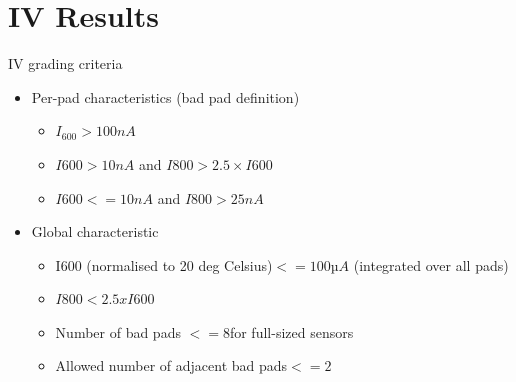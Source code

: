 \documentclass{beamer}
\begin{document}
  

\section{IV Results}

\begin{frame}{IV grading criteria}
   \begin{itemize}
       \item \alert{Per-pad} characteristics (\alert{bad pad} definition)
            \begin{itemize}
                \item $ {I}_{600} > 100 nA $
                \item $ I600 > 10 nA  $  and $ I800 > 2.5 \times I600 $
                \item $ I600 <= 10 nA $  and $ I800 > 25 nA $
            \end{itemize}
       \item \alert{Global} characteristic
            \begin{itemize}
                \item I600 (normalised to 20 deg Celsius)$ <= 100 µA $ (integrated over all pads)
                \item $ I800 < 2.5 x I600 $
                \item Number of bad pads $ <= 8 $for full-sized sensors
                \item Allowed number of adjacent bad pads$ <= 2$
            \end{itemize}
   \end{itemize}

\end{frame}
\end{document}
